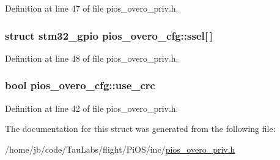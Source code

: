 \-Definition at line 47 of file pios\-\_\-overo\-\_\-priv.\-h.

\hypertarget{structpios__overo__cfg_a900adf7a473ee816fb7044425cabd0de}{
\subsubsection[{ssel}]{\setlength{\rightskip}{0pt plus 5cm}struct {\bf stm32\-\_\-gpio} {\bf pios\-\_\-overo\-\_\-cfg\-::ssel}\mbox{[}$\,$\mbox{]}}}\label{structpios__overo__cfg_a900adf7a473ee816fb7044425cabd0de}


\-Definition at line 48 of file pios\-\_\-overo\-\_\-priv.\-h.

\hypertarget{structpios__overo__cfg_afee45313c7db22563bb644ca87b79bac}{
\subsubsection[{use\-\_\-crc}]{\setlength{\rightskip}{0pt plus 5cm}bool {\bf pios\-\_\-overo\-\_\-cfg\-::use\-\_\-crc}}}\label{structpios__overo__cfg_afee45313c7db22563bb644ca87b79bac}


\-Definition at line 42 of file pios\-\_\-overo\-\_\-priv.\-h.



\-The documentation for this struct was generated from the following file\-:\begin{DoxyCompactItemize}
\item 
/home/jb/code/\-Tau\-Labs/flight/\-Pi\-O\-S/inc/\hyperlink{pios__overo__priv_8h}{pios\-\_\-overo\-\_\-priv.\-h}\end{DoxyCompactItemize}
